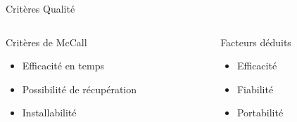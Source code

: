 \author{Martin \textsc{Gaborit}}

\begin{frame}{Critères Qualité}
  \begin{columns}[t]
    \begin{column}{5.5cm}
      \begin{block}{Critères de McCall}
	\onslide<2,3,4,5,6,7>
	\begin{itemize}
	\item Efficacité en temps
	\onslide<4,5,6,7>
	\item Possibilité de récupération
	\onslide<6,7>
	\item Installabilité
	\end{itemize}
      \end{block}
    \end{column}

    \begin{column}{5.5cm}
      \begin{block}{Facteurs déduits}
	\onslide<2>
	\begin{itemize}
	  \item Efficacité
	  \onslide<5,6,7>
	  \item Fiabilité
	  \onslide<7>
	  \item Portabilité
	\end{itemize}
      \end{block}
    \end{column}
  \end{columns}
\end{frame}
